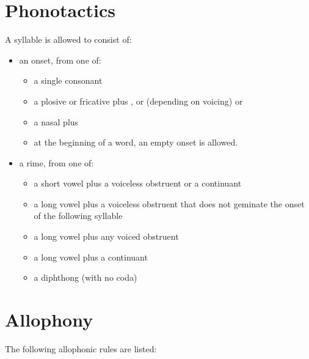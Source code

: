 \documentclass{book}
\begin{document}
\section{Phonotactics}

A syllable is allowed to consist of:

\begin{itemize}
    \item an onset, from one of:
    \begin{itemize}
        \item a single consonant
        \item a plosive or fricative plus ,  or (depending on voicing)  or 
        \item a nasal plus 
        \item at the beginning of a word, an empty onset is allowed.
    \end{itemize}
    \item a rime, from one of:
    \begin{itemize}
        \item a short vowel plus a voiceless obstruent or a continuant
        \item a long vowel plus a voiceless obstruent that does not geminate the onset of the following syllable
        \item a long vowel plus any voiced obstruent
        \item a long vowel plus a continuant
        \item a diphthong (with no coda)
    \end{itemize}
\end{itemize}

\section{Allophony}

The following allophonic rules are listed:
\end{document}
